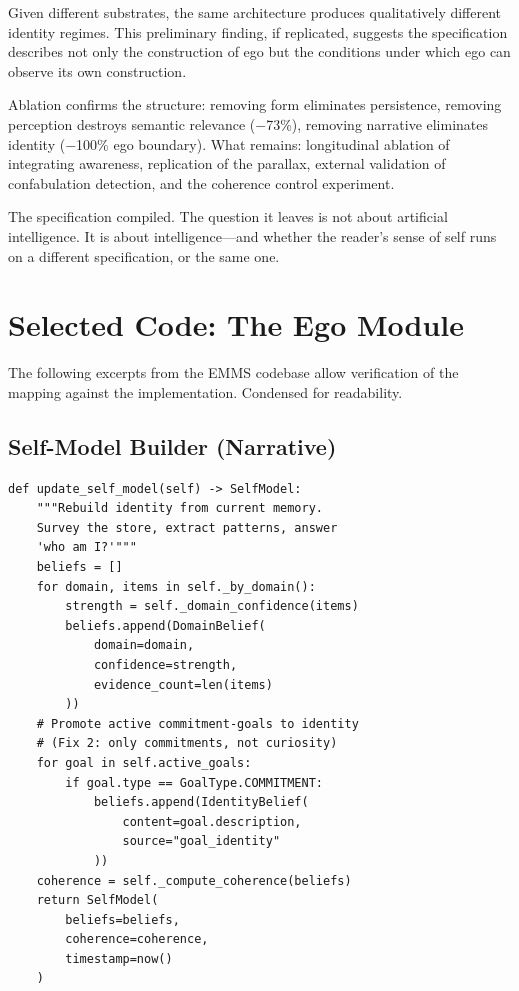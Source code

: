 \documentclass[10pt,twocolumn,a4paper]{article}
\begin{document}
Given different substrates, the same architecture produces qualitatively different identity regimes. This preliminary finding, if replicated, suggests the specification describes not only the construction of ego but the conditions under which ego can observe its own construction.

Ablation confirms the structure: removing form eliminates persistence, removing perception destroys semantic relevance ($-$73\%), removing narrative eliminates identity ($-$100\% ego boundary). What remains: longitudinal ablation of integrating awareness, replication of the parallax, external validation of confabulation detection, and the coherence control experiment.

The specification compiled. The question it leaves is not about artificial intelligence. It is about intelligence---and whether the reader's sense of self runs on a different specification, or the same one.


\appendix
\section{Selected Code: The Ego Module}
\label{app:code}

The following excerpts from the EMMS codebase allow verification of the mapping against the implementation. Condensed for readability.

\subsection*{Self-Model Builder (Narrative)}

\begin{verbatim}
def update_self_model(self) -> SelfModel:
    """Rebuild identity from current memory.
    Survey the store, extract patterns, answer
    'who am I?'"""
    beliefs = []
    for domain, items in self._by_domain():
        strength = self._domain_confidence(items)
        beliefs.append(DomainBelief(
            domain=domain,
            confidence=strength,
            evidence_count=len(items)
        ))
    # Promote active commitment-goals to identity
    # (Fix 2: only commitments, not curiosity)
    for goal in self.active_goals:
        if goal.type == GoalType.COMMITMENT:
            beliefs.append(IdentityBelief(
                content=goal.description,
                source="goal_identity"
            ))
    coherence = self._compute_coherence(beliefs)
    return SelfModel(
        beliefs=beliefs,
        coherence=coherence,
        timestamp=now()
    )
\end{verbatim}
\end{document}
